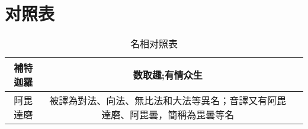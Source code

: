 \section{对照表}


\begin{table}[H]
  \centering
  \caption[]{名相对照表}
  \begin{tabular}{|c|c|c|}
    \hline 補特迦羅 & 数取趣;有情众生 & \\
    \hline 阿毘達磨 & 被譯為對法、向法、無比法和大法等異名；音譯又有阿毘達磨、阿毘曇，簡稱為毘曇等名 & \\  
    \hline
  \end{tabular}
\end{table}
